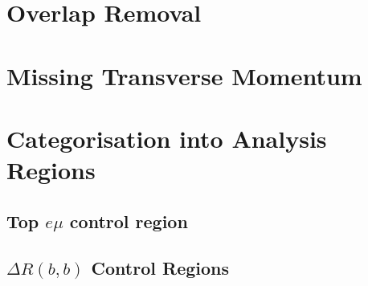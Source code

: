 \section{Overlap Removal}

\section{Missing Transverse Momentum}

\section{Categorisation into Analysis Regions}
\label{sec:ana-regions}

\subsection{Top \texorpdfstring{$e \mu$}{e mu} control region}%

\label{sec:topemucr}
\subsection{\texorpdfstring{$\Delta R(b,b)$}{DRbb} Control Regions}%
\label{sec:control-region-defintions}


